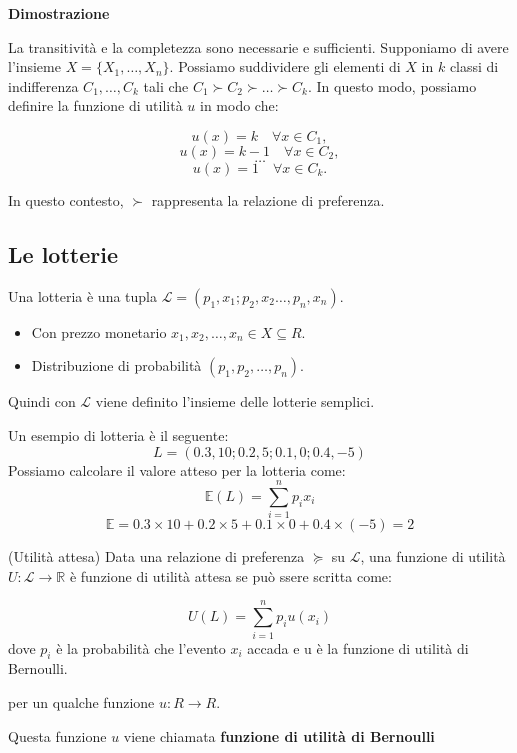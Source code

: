 \textbf{Dimostrazione}

La transitività e la completezza sono necessarie e sufficienti. Supponiamo di
avere l'insieme $X = \{X_1, \ldots, X_n\}$. Possiamo suddividere gli elementi
di $X$ in $k$ classi di indifferenza $C_1, \ldots, C_k$ tali che $C_1 \succ C_2
    \succ \ldots \succ C_k$. In questo modo, possiamo definire la funzione di
utilità $u$ in modo che:

\[
    u(x) = k \quad \forall x \in C_1,
\]
\[
    u(x) = k-1 \quad \forall x \in C_2,
\]
\[
    \ldots
\]
\[
    u(x) = 1 \quad \forall x \in C_k.
\]

In questo contesto, $\succ$ rappresenta la relazione di preferenza.

\subsection{Le lotterie}

Una lotteria è una tupla $\mathcal{L} = (p_1,x_1;p_2,x_2 \ldots, p_n,x_n)$.

\begin{itemize}
    \item Con prezzo monetario $x_1,x_2, \dots, x_n \in X \subseteq R$.
    \item Distribuzione di probabilità $(p_1, p_2, \dots, p_n)$.
\end{itemize}

Quindi con $\mathcal{L}$ viene definito l'insieme delle lotterie semplici.

Un esempio di lotteria è il seguente:
\[
    L = (0.3,10; 0.2,5; 0.1,0; 0.4,-5)\]
Possiamo calcolare il valore atteso per la lotteria come:
\[
    \mathbb{E}(L) = \sum_{i=1}^n {p_i}{x_i}
\]
\[
    \mathbb{E} = 0.3 \times 10 + 0.2 \times 5 + 0.1 \times 0 + 0.4 \times (-5) = 2
\]

\begin{definition}(Utilità attesa)
    Data una relazione di preferenza $\succcurlyeq$ su $\mathcal{L}$, una funzione di utilità $U: \mathcal{L} \rightarrow \mathbb{R}$ è
    funzione di utilità attesa se può ssere scritta come:
\end{definition}

\[
    U(L) = \sum_{i=1}^n{p_i}u(x_i)
\]
dove $p_i$ è la probabilità che l'evento $x_i$ accada e u è la funzione di
utilità di Bernoulli.

per un qualche funzione $u:R \rightarrow R$.

Questa funzione $u$ viene chiamata \textbf{funzione di utilità di Bernoulli}

